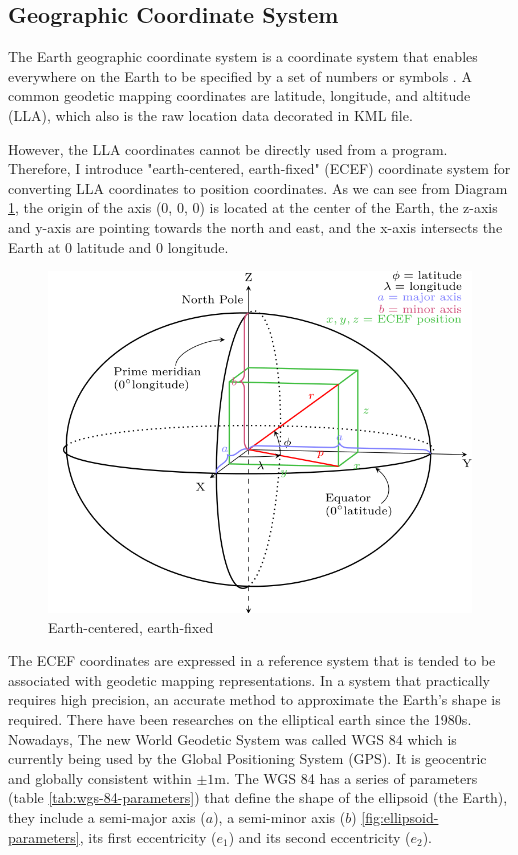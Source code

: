 \subsection{Geographic Coordinate System}

The Earth geographic coordinate system is a coordinate system that enables everywhere on the Earth to be specified by a set of numbers or symbols \cite{wiki.geographic-coordinate-system.2016}. A common geodetic mapping coordinates are latitude, longitude, and altitude (LLA), which also is the raw location data decorated in KML file.

However, the LLA coordinates cannot be directly used from a program. Therefore, I introduce "earth-centered, earth-fixed" (ECEF) coordinate system for converting LLA coordinates to position coordinates. As we can see from Diagram \ref{fig:ecef}, the origin of the axis (0, 0, 0) is located at the center of the Earth, the z-axis and y-axis are pointing towards the north and east, and the x-axis intersects the Earth at $0$ latitude and $0$ longitude.

\begin{figure}[H]
\caption[ECEF]{Earth-centered, earth-fixed \cite{wiki.ecef.2016}}
\label{fig:ecef}
\centering
\includegraphics[width=\textwidth, keepaspectratio]{Figures/ecef.png}
\decoRule
\end{figure}

The ECEF coordinates are expressed in a reference system that is tended to be associated with geodetic mapping representations. In a system that practically requires high precision,  an accurate method to approximate the Earth’s shape is required. There have been researches on the elliptical earth since the 1980s. Nowadays, The new World Geodetic System was called WGS 84 which is currently being used by the Global Positioning System (GPS). It is geocentric and globally consistent within $\pm{1}$m. The WGS 84 has a series of parameters (table \ref{tab:wgs-84-parameters}) that define the shape of the ellipsoid (the Earth), they include a semi-major axis ($a$), a semi-minor axis ($b$) \ref{fig:ellipsoid-parameters}, its first eccentricity ($e_1$) and its second eccentricity ($e_2$).

